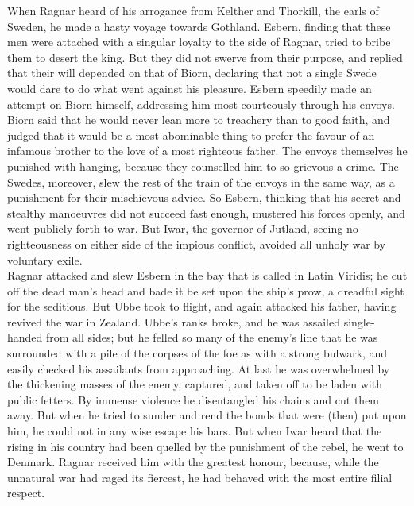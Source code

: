 \documentclass[10pt,a4paper]{report}
\begin{document}
When Ragnar heard of his arrogance from Kelther and Thorkill, the earls of Sweden, he made a hasty voyage towards Gothland. Esbern, finding that these men were attached with a singular loyalty to the side of Ragnar, tried to bribe them to desert the king. But they did not swerve from their purpose, and replied that their will depended on that of Biorn, declaring that not a single Swede would dare to do what went against his pleasure. Esbern speedily made an attempt on Biorn himself, addressing him most courteously through his envoys. Biorn said that he would never lean more to treachery than to good faith, and judged that it would be a most abominable thing to prefer the favour of an infamous brother to the love of a most righteous father. The envoys themselves he punished with hanging, because they counselled him to so grievous a crime. The Swedes, moreover, slew the rest of the train of the envoys in the same way, as a punishment for their mischievous advice. So Esbern, thinking that his secret and stealthy manoeuvres did not succeed fast enough, mustered his forces openly, and went publicly forth to war. But Iwar, the governor of Jutland, seeing no righteousness on either side of the impious conflict, avoided all unholy war by voluntary exile.\\

Ragnar attacked and slew Esbern in the bay that is called in Latin Viridis; he cut off the dead man's head and bade it be set upon the ship's prow, a dreadful sight for the seditious. But Ubbe took to flight, and again attacked his father, having revived the war in Zealand. Ubbe's ranks broke, and he was assailed single-handed from all sides; but he felled so many of the enemy's line that he was surrounded with a pile of the corpses of the foe as with a strong bulwark, and easily checked his assailants from approaching. At last he was overwhelmed by the thickening masses of the enemy, captured, and taken off to be laden with public fetters. By immense violence he disentangled his chains and cut them away. But when he tried to sunder and rend the bonds that were (then) put upon him, he could not in any wise escape his bars. But when Iwar heard that the rising in his country had been quelled by the punishment of the rebel, he went to Denmark. Ragnar received him with the greatest honour, because, while the unnatural war had raged its fiercest, he had behaved with the most entire filial respect.\\
\end{document}
